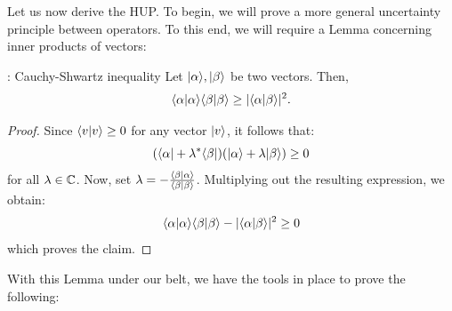 Let us now derive the HUP. To begin, we will prove a more general uncertainty principle between operators. To this end, we will require a Lemma concerning inner products of vectors:

\begin{lembox}{: Cauchy-Shwartz inequality}
    Let $\lvert \alpha \rangle, \lvert \beta \rangle$ be two vectors. Then,
    \begin{equation}
        \langle \alpha \lvert \alpha \rangle\langle \beta \lvert \beta \rangle \geq \lvert \langle \alpha \lvert \beta \rangle \rvert^2.
    \end{equation}
\end{lembox}
\begin{proof}
    Since $\langle v \lvert v \rangle \geq 0$ for any vector $\lvert v \rangle$, it follows that:
    \begin{equation}
        (\langle \alpha \rvert + \lambda^*\langle \beta \rvert)(\lvert \alpha \rangle + \lambda\lvert \beta \rangle) \geq 0
    \end{equation}
    for all $\lambda \in \mathbb{C}$. Now, set $\lambda = -\frac{\langle \beta \lvert \alpha \rangle}{\langle \beta \lvert \beta \rangle}$. Multiplying out the resulting expression, we obtain:
    \begin{equation}
        \langle \alpha \lvert \alpha \rangle\langle \beta \lvert \beta \rangle - \lvert \langle \alpha \lvert \beta \rangle \rvert^2 \geq 0
    \end{equation}
    which proves the claim.
\end{proof}

With this Lemma under our belt, we have the tools in place to prove the following:


